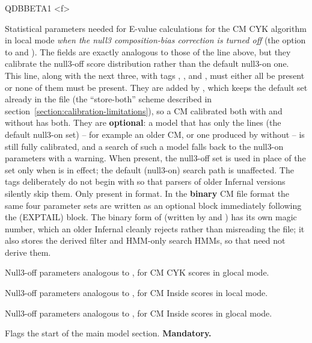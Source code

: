 \begin{sreitems}{QDBBETA1 <f>}
\item [\emprog{NONULL3\_LC <f1> <f2> <f3> <d1> <d2> <f4>}] Statistical
  parameters needed for E-value calculations for the CM CYK algorithm
  in local mode \emph{when the null3 composition-bias correction is
  turned off} (the  option to  and
  ). The fields are exactly analogous to those of the
   line above, but they calibrate the null3-off score
  distribution rather than the default null3-on one. This line, along
  with the next three, with tags , ,
  and , must either all be present or none of them
  must be present. They are added by ,
  which keeps the default  set already in the file (the
  ``store-both'' scheme described in
  section~\ref{section:calibration-limitations}), so a CM calibrated
  both with and without  has both. They are
  \textbf{optional}: a
  model that has only the  lines (the default null3-on
  set) -- for example an older CM, or one produced by
   without  -- is still fully
  calibrated, and a  search of such a model falls back
  to the null3-on parameters with a warning. When present, the
  null3-off set is used in place of the  set only when
   is in effect; the default (null3-on) search path is
  unaffected. The tags deliberately do not begin with  so
  that parsers of older Infernal versions silently skip them. Only
  present in  format. In the \textbf{binary} CM
  file format the same four parameter sets are written as an optional
  block immediately following the  (EXPTAIL) block. The
  binary form of  (written by 
  and ) has its own magic number, which an older
  Infernal cleanly rejects rather than misreading the file; it also
  stores the derived filter and HMM-only search HMMs, so that
   need not derive them.

\item [\emprog{NONULL3\_GC <f1> <f2> <f3> <d1> <d2> <f4>}] Null3-off
  parameters analogous to , for CM CYK scores in
  glocal mode.

\item [\emprog{NONULL3\_LI <f1> <f2> <f3> <d1> <d2> <f4>}] Null3-off
  parameters analogous to , for CM Inside scores in
  local mode.

\item [\emprog{NONULL3\_GI <f1> <f2> <f3> <d1> <d2> <f4>}] Null3-off
  parameters analogous to , for CM Inside scores in
  glocal mode.

\item [\emprog{CM}] Flags the start of the main model
section. \textbf{Mandatory.}

\end{sreitems}

